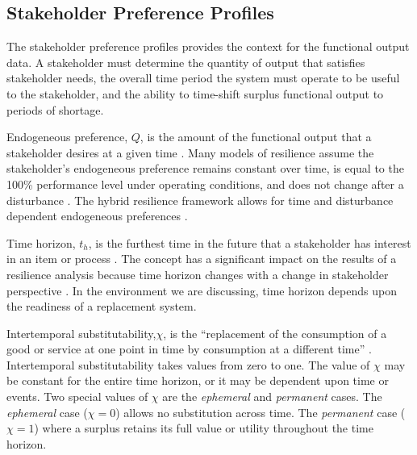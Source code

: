 \documentclass[preprint,12pt]{elsarticle}
\begin{document}
\subsection{Stakeholder Preference Profiles}
The stakeholder preference profiles provides the context for the
functional output data. A stakeholder must determine the quantity of
output that satisfies stakeholder needs, the overall time period the
system must operate to be useful to the stakeholder, and the ability
to time-shift surplus functional output to periods of shortage.


Endogeneous preference, $Q$, is the amount of the functional output
that a stakeholder desires at a given time \cite{Black2013}.  Many
models of resilience assume the stakeholder's endogeneous preference
remains constant over time, is equal to the 100\% 
performance level under operating conditions, and does not change
after a disturbance \cite{Emanuel2017}. The hybrid resilience
framework allows for time and disturbance dependent endogeneous
preferences \cite{Emanuel2018}.

Time horizon, $t_h$, is the furthest time in the future that a
stakeholder has interest in an item or process \cite{Black2013}. The
concept has a significant impact on the results of a resilience
analysis because time horizon changes with a change in stakeholder
perspective \cite{Emanuel2018}. In the environment we are discussing,
time horizon depends upon the readiness of a replacement system.


Intertemporal substitutability,$\chi$, is the ``replacement of the consumption
of a good or service at one point in time by consumption at a
different time'' \cite{Black2013}. Intertemporal substitutability takes 
values from zero to one. The value of $\chi$ may be constant for the
entire time horizon, or it may be dependent upon time or events. Two
special values of $\chi$ are the \emph{ephemeral} and \emph{permanent}
cases. The \emph{ephemeral} case ($\chi = 0$) allows no substitution across
time.  The  \emph{permanent} case ($\chi = 1$) where a
surplus retains its full value or utility throughout the time
horizon. 
\end{document}
